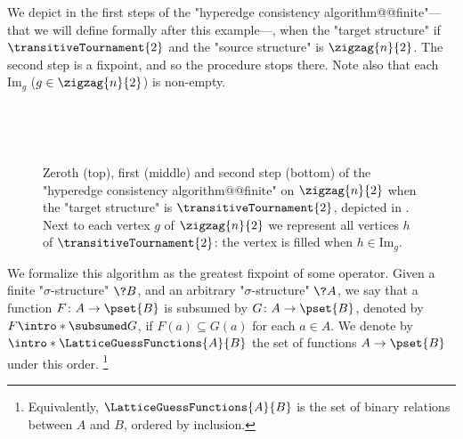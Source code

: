 \begin{example}
	\AP\label{ex:zigzag-HC-T2}
	We depict in  the first steps of the "hyperedge consistency algorithm@@finite"---that we will define formally after this example---, when the "target structure"
	if $\transitiveTournament{2}$ and the "source structure" is $\zigzag{n}{2}$.
	The second step is a fixpoint, and so the procedure stops there. Note also that
	each $\textrm{Im}_g$ ($g\in \zigzag{n}{2}$) is non-empty. 
\end{example}

\begin{figure}
	\centering
	\begin{tikzpicture}
		
		
	\end{tikzpicture}\\[2em]
	\begin{tikzpicture}
		
		
	\end{tikzpicture}\\[2em]
	\begin{tikzpicture}
		
		
	\end{tikzpicture}
	\caption{\AP\label{fig:zigzag-graph-HC-T2} Zeroth (top), first (middle) and second step (bottom) of the "hyperedge consistency algorithm@@finite" on $\zigzag{n}{2}$
	when the "target structure" is $\transitiveTournament{2}$, depicted in . Next to each vertex $g$ of $\zigzag{n}{2}$ we represent
	all vertices $h$ of $\transitiveTournament{2}$: the vertex is filled
	when $h \in \textrm{Im}_{g}$.
	}
\end{figure}
\begin{marginfigure}[-21em]
	\centering
	\begin{tikzpicture}
		
	\end{tikzpicture}
	\caption{
		\AP\label{fig:zigzag-graph-HC-T2-side-T2}
		The "$2$-transitive tournament" $\transitiveTournament{2}$.
	}
\end{marginfigure}

We formalize this algorithm as the greatest fixpoint of some operator.
Given a finite "$\sigma$-structure" $\?B$, and an arbitrary%
%
"$\sigma$-structure" $\?A$, we say that a function $F\colon A \to \pset{B}$ is subsumed
by $G\colon A \to \pset{B}$, denoted by \AP\(F \intro*\subsumed G\),
if $F(a) \subseteq G(a)$ for each $a \in A$. We denote by
\AP\(\intro*\LatticeGuessFunctions{A}{B}\) the set of functions $A \to \pset{B}$ under this order.%
\footnote{Equivalently, $\LatticeGuessFunctions{A}{B}$ is the
set of binary relations between $A$ and $B$, ordered by inclusion.}

